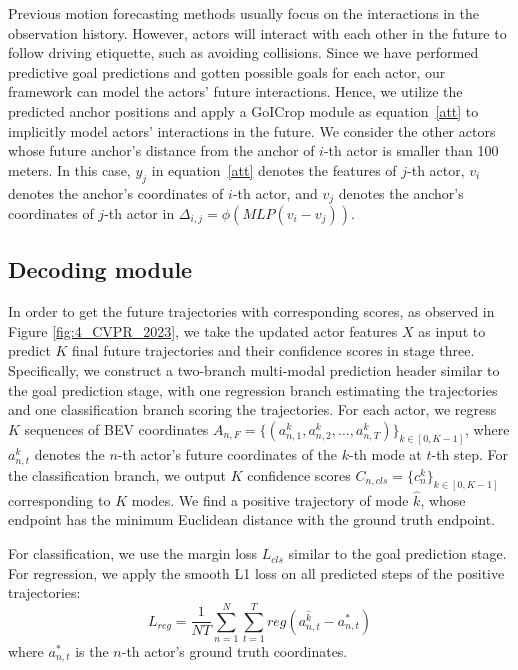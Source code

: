 Previous motion forecasting methods usually focus on the interactions in the observation history. 
However, actors will interact with each other in the future to follow driving etiquette, such as avoiding collisions. 
Since we have performed predictive goal predictions and gotten possible goals for each actor, our framework can model the actors' future interactions.
Hence, we utilize the predicted anchor positions and apply a GoICrop module as equation~\ref{att} to implicitly model actors' interactions in the future. We consider the other actors whose future anchor's distance from the anchor of $i$-th actor is smaller than 100 meters. In this case, $y_j$ in equation~\ref{att} denotes the features of $j$-th actor, $v_i$ denotes the anchor's coordinates of $i$-th actor, and $v_j$ denotes the anchor's coordinates of $j$-th actor in $\Delta_{i,j}=\phi(MLP(v_i-v_j))$.

\subsection{Decoding module}
In order to get the future trajectories with corresponding scores, as observed in Figure \ref{fig:4_CVPR_2023}, we take the updated actor features $X$ as input to predict $K$ final future trajectories and their confidence scores in stage three. 
Specifically, we construct a two-branch multi-modal prediction header similar to the goal prediction stage, with one regression branch estimating the trajectories and one classification branch scoring the trajectories.
For each actor, we regress $K$ sequences of BEV coordinates 
$    A_{n,F}=\{(a_{n,1}^k,a_{n,2}^k,...,a_{n,T}^k)\}_{k \in [0,K-1]}$,
where $a_{n,t}^k$ denotes the $n$-th actor's future coordinates of the $k$-th mode at $t$-th step. 
For the classification branch, we output $K$ confidence scores $    C_{n,cls} = \{c_n^k\}_{k \in [0,K-1]}
$ corresponding to $K$ modes.
We find a positive trajectory of mode $\hat{k}$, whose endpoint has the minimum Euclidean distance with the ground truth endpoint.

For classification, we use the margin loss  $L_{cls}$ similar to the goal prediction stage. 
For regression, we apply the smooth L1 loss on all predicted steps of the positive trajectories:
\begin{equation}
	L_{reg}=\frac{1}{NT}\sum_{n=1}^N\sum_{t=1}^T{reg(a_{n,t}^{\hat{k}}-a^{*}_{n,t})}
\end{equation}
where $a^{*}_{n,t}$ is the $n$-th actor's ground truth coordinates.

